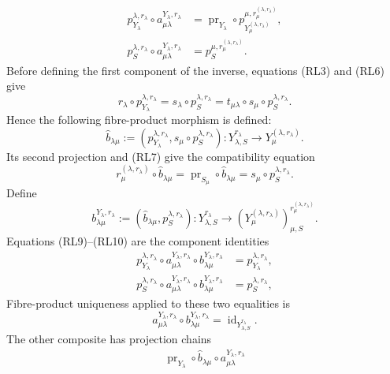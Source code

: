 \begin{definition}
\[\begin{aligned}
    p_{Y_\lambda}^{\lambda,r_\lambda}
      \circ a_{\mu\lambda}^{Y_\lambda,r_\lambda}
      &=
      \operatorname{pr}_{Y_\lambda}\circ
      p_{Y_\mu^{(\lambda,r_\lambda)}}^{
        \mu,r_\mu^{(\lambda,r_\lambda)}},\\
    p_S^{\lambda,r_\lambda}
      \circ a_{\mu\lambda}^{Y_\lambda,r_\lambda}
      &=
      p_S^{\mu,r_\mu^{(\lambda,r_\lambda)}}.
  \end{aligned}                                                     \tag{RL9}
  \]
  Before defining the first component of the inverse, equations (RL3) and
  (RL6) give
  \[
    r_\lambda\circ p_{Y_\lambda}^{\lambda,r_\lambda}
      =s_\lambda\circ p_S^{\lambda,r_\lambda}
      =t_{\mu\lambda}\circ s_\mu\circ
        p_S^{\lambda,r_\lambda}.
  \]
  Hence the following fibre-product morphism is defined:
  \[
    \widehat b_{\lambda\mu}:=
      (p_{Y_\lambda}^{\lambda,r_\lambda},
        s_\mu\circ p_S^{\lambda,r_\lambda})
      \colon Y_{\lambda,S}^{r_\lambda}
        \longrightarrow Y_\mu^{(\lambda,r_\lambda)}.
  \]
  Its second projection and (RL7) give the compatibility equation
  \[
    r_\mu^{(\lambda,r_\lambda)}\circ\widehat b_{\lambda\mu}
      =\operatorname{pr}_{S_\mu}\circ\widehat b_{\lambda\mu}
      =s_\mu\circ p_S^{\lambda,r_\lambda}.
  \]
  Define
  \[
    b_{\lambda\mu}^{Y_\lambda,r_\lambda}:=
      (\widehat b_{\lambda\mu},p_S^{\lambda,r_\lambda})
      \colon Y_{\lambda,S}^{r_\lambda}\longrightarrow
      (Y_\mu^{(\lambda,r_\lambda)})_{
        \mu,S}^{r_\mu^{(\lambda,r_\lambda)}}.
                                                                    \tag{RL10}
  \]
  Equations (RL9)--(RL10) are the component identities
  \[
  \begin{aligned}
    p_{Y_\lambda}^{\lambda,r_\lambda}\circ
      a_{\mu\lambda}^{Y_\lambda,r_\lambda}\circ
      b_{\lambda\mu}^{Y_\lambda,r_\lambda}
      &=p_{Y_\lambda}^{\lambda,r_\lambda},\\
    p_S^{\lambda,r_\lambda}\circ
      a_{\mu\lambda}^{Y_\lambda,r_\lambda}\circ
      b_{\lambda\mu}^{Y_\lambda,r_\lambda}
      &=p_S^{\lambda,r_\lambda},
  \end{aligned}
  \]
  Fibre-product uniqueness applied to these two equalities is
  \[
    a_{\mu\lambda}^{Y_\lambda,r_\lambda}\circ
      b_{\lambda\mu}^{Y_\lambda,r_\lambda}
      =\operatorname{id}_{Y_{\lambda,S}^{r_\lambda}}.             \tag{RL11}
  \]
  The other composite has projection chains
  \[
  \begin{aligned}
    \operatorname{pr}_{Y_\lambda}\circ\widehat b_{\lambda\mu}\circ
      a_{\mu\lambda}^{Y_\lambda,r_\lambda}

\end{aligned}\]
\end{definition}
